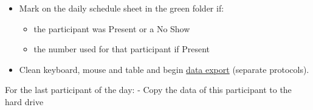\documentclass[]{article}
\providecommand{\tightlist}{%
  \setlength{\itemsep}{0pt}\setlength{\parskip}{0pt}}
\begin{document}
\begin{itemize}
\tightlist
\item
  Mark on the daily schedule sheet in the green folder if:

  \begin{itemize}
  \tightlist
  \item
    the participant was Present or a No Show\\
  \item
    the number used for that participant if Present
  \end{itemize}
\item
  Clean keyboard, mouse and table and begin
  \href{sex-differences-data-export.md}{data export} (separate
  protocols).
\end{itemize}

For the last participant of the day: - Copy the data of this participant
to the hard drive
\end{document}
